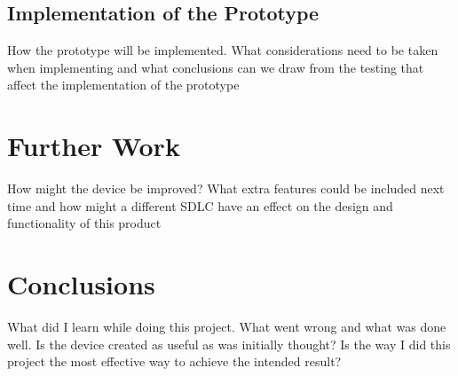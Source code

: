 \documentclass[10pt,a4paper]{article}
\begin{document}
\subsection{Implementation of the Prototype}
How the prototype will be implemented. What considerations need to be taken when implementing and what conclusions can we draw from the testing that affect the implementation of the prototype

\section{Further Work}
How might the device be improved? What extra features could be included next time and how might a different SDLC have an effect on the design and functionality of this product

\section{Conclusions}
What did I learn while doing this project. What went wrong and what was done well. Is the device created as useful as was initially thought? Is the way I did this project the most effective way to achieve the intended result? 

\pagebreak


\end{document}

